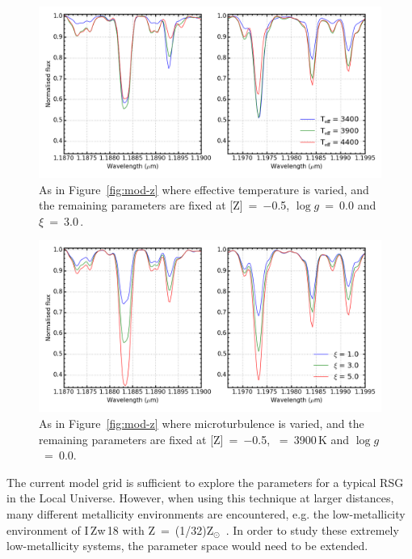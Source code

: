 \begin{figure}
 \centering
\includegraphics[width=\textwidth]{JAnal/varyTv2}
\caption[An example of the effect of effective temperature on the appearance of the model gird spectra]{
As in Figure~\ref{fig:mod-z} where effective temperature is varied, and the remaining parameters are fixed at [Z]~=~$-$0.5, $\log g$~=~0.0 and $\xi$~=~3.0\,\kms.\label{fig:mod-t}
         }
\end{figure}
\begin{figure}
 \centering
\includegraphics[width=\textwidth]{JAnal/varymicrov2}
\caption[An example of the effect of microturbulence on the appearance of the model gird spectra]{
As in Figure~\ref{fig:mod-z} where microturbulence is varied, and the remaining parameters are fixed at [Z]~=~$-$0.5, \Teff~=~3900\,K and $\log g$~=~0.0.\label{fig:mod-micro}
         }
\end{figure}

The current model grid is sufficient to explore the parameters for a typical RSG in the Local Universe.
However, when using this technique at larger distances,
many different metallicity environments are encountered, e.g. the low-metallicity environment of I\,Zw\,18 with Z~=~(1/32)Z$_{\odot}$~\citep{1998ApJ...508..248V}.
In order to study these extremely low-metallicity systems,
the parameter space would need to be extended.

